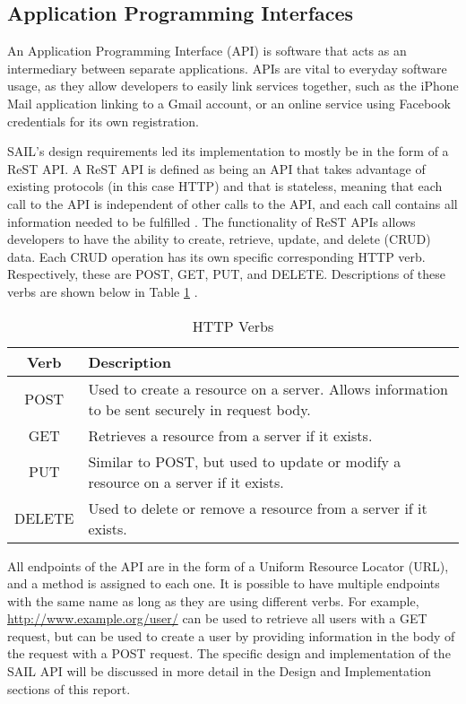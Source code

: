 \documentclass[10pt, titlepage, onecolumn, openany]{article}
\begin{document}
\subsection{Application Programming Interfaces}
An Application Programming Interface (API) is software that acts as an intermediary
between separate applications. APIs are vital to everyday software usage, as they
allow developers to easily link services together, such as the iPhone Mail
application linking to a Gmail account, or an online service using Facebook
credentials for its own registration.

SAIL's design requirements led its implementation to mostly be in the form of a
ReST API. A ReST API is defined as being an API that takes advantage of existing
protocols (in this case HTTP) and that is stateless, meaning that each call to
the API is independent of other calls to the API, and each call contains all
information needed to be fulfilled \cite{whatIsAPI}. The functionality of ReST APIs
allows developers to have the ability to create, retrieve, update, and
delete (CRUD) data. Each CRUD operation has its own specific corresponding HTTP
verb. Respectively, these are POST, GET, PUT, and DELETE. Descriptions of these
verbs are shown below in Table \ref{httpVerbs} \cite{httpMethods}.

\begin{table}[b]
\caption{HTTP Verbs}
\centering
\begin{tabular}{|c|p{5cm}|}
    \hline
    \textbf{Verb} & \textbf{Description} \\
    \hline
    POST & Used to create a resource on a server. Allows information to be
    sent securely in request body. \\
    \hline
    GET & Retrieves a resource from a server if it exists. \\
    \hline
    PUT & Similar to POST, but used to update or modify a resource on a server
    if it exists. \\
    \hline
    DELETE & Used to delete or remove a resource from a server if it exists. \\
    \hline
\end{tabular}
\label{httpVerbs}
\end{table}

All endpoints of the API are in the form of a Uniform Resource Locator (URL), and a method is
assigned to each one. It is possible to have multiple endpoints with the same name
as long as they are using different verbs. For example, \url{http://www.example.org/user/} can
be used to retrieve all users with a GET request, but can be used to create a user
by providing information in the body of the request with a POST request.
The specific design and implementation of the SAIL API will be
discussed in more detail in the Design and Implementation sections
of this report.
\end{document}
